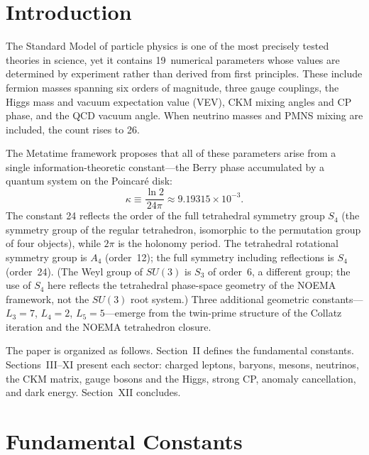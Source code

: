 \documentclass[aps,prd,reprint,twocolumn,showpacs,superscriptaddress]{revtex4-2}
\begin{document}
\maketitle

\section{Introduction}

The Standard Model of particle physics is one of the most precisely tested
theories in science, yet it contains 19~numerical parameters whose values
are determined by experiment rather than derived from first principles.
These include fermion masses spanning six orders of magnitude, three gauge
couplings, the Higgs mass and vacuum expectation value (VEV), CKM mixing
angles and CP phase, and the QCD vacuum angle.  When neutrino masses and
PMNS mixing are included, the count rises to 26.

The Metatime framework proposes that all of these parameters arise from a
single information-theoretic constant---the Berry phase accumulated by a
quantum system on the Poincar\'{e} disk:
\begin{equation}
\kappa \equiv \frac{\ln 2}{24\pi} \approx 9.19315 \times 10^{-3}.
\label{eq:oi}
\end{equation}
The constant 24 reflects the order of the full tetrahedral symmetry group
$S_4$ (the symmetry group of the regular tetrahedron, isomorphic to the
permutation group of four objects), while $2\pi$ is the holonomy period.
The tetrahedral rotational symmetry group is $A_4$ (order~12); the full
symmetry including reflections is $S_4$ (order~24).  (The Weyl group of
$SU(3)$ is $S_3$ of order~6, a different group; the use of $S_4$ here
reflects the tetrahedral phase-space geometry of the NOEMA framework,
not the $SU(3)$ root system.)  Three
additional geometric constants---$L_3 = 7$, $L_4 = 2$, $L_5 = 5$---emerge
from the twin-prime structure of the Collatz iteration and the NOEMA
tetrahedron closure.

The paper is organized as follows.  Section~II defines the fundamental
constants.  Sections~III--XI present each sector: charged leptons,
baryons, mesons, neutrinos, the CKM matrix, gauge bosons and the Higgs,
strong CP, anomaly cancellation, and dark energy.  Section~XII concludes.

\section{Fundamental Constants}
\label{sec:constants}
\end{document}

